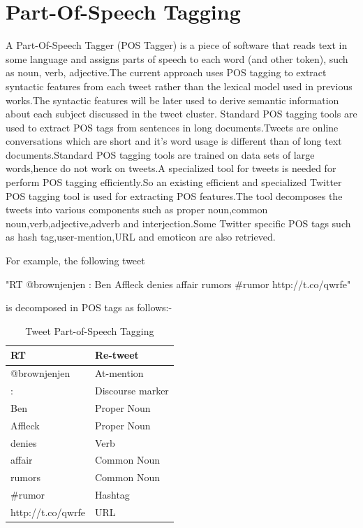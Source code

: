 		
		\section{Part-Of-Speech Tagging}
		A Part-Of-Speech Tagger (POS Tagger) is a piece of software that reads text in some language and assigns parts of speech to each word (and other token), such as noun, verb, adjective.The current approach uses POS tagging to extract syntactic features from each tweet rather than the lexical model used in previous works.The syntactic features will be later used to derive semantic information about each subject discussed in the tweet cluster.		Standard POS tagging tools are used to extract POS tags from sentences in long documents.Tweets are online conversations which are short and it's word usage is different than of long text documents.Standard POS tagging tools are trained on data sets of large words,hence do not work on tweets.A specialized tool for tweets is needed for perform POS tagging efficiently.So an existing efficient and specialized Twitter POS tagging tool \cite{gimpel2011part} is used for extracting  POS features.The tool decomposes the tweets into various components such as proper noun,common noun,verb,adjective,adverb and interjection.Some Twitter specific POS tags such as hash tag,user-mention,URL and emoticon are also retrieved.

		\par For example, the following tweet
		\begin{center}
		 "RT @brownjenjen : Ben Affleck denies affair rumors
		\#rumor http://t.co/qwrfe"
		\end{center} 
		\par is decomposed in POS tags as follows:-
		
		
\begin{table}[H]
	\centering
	\begin{tabular}{@{}|l|l|@{}}
		\toprule
		RT                & Re-tweet         \\ \midrule
		@brownjenjen        & At-mention       \\ \midrule
		:                 & Discourse marker \\ \midrule
		Ben               & Proper Noun      \\ \midrule
		Affleck           & Proper Noun      \\ \midrule
		denies            & Verb             \\ \midrule
		affair            & Common Noun      \\ \midrule
		rumors            & Common Noun      \\ \midrule
		\#rumor           & Hashtag          \\ \midrule
		http://t.co/qwrfe & URL              \\ \bottomrule
	\end{tabular}
	\caption{Tweet Part-of-Speech Tagging}
	\label{my-label}
\end{table}





